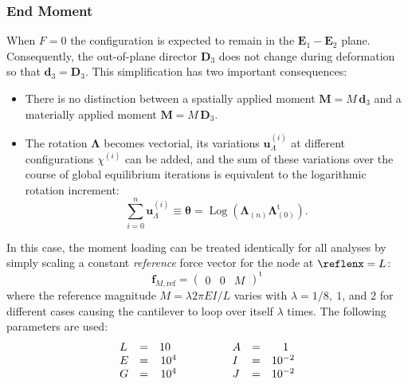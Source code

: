 \subsubsection{End Moment}\label{sec:circle}
%
%
When \(F = 0\) the configuration is expected
to remain in the \(\mathbf{E}_1 - \mathbf{E}_2\) plane.
Consequently, the out-of-plane director
\(\mathbf{D}_3\) does not change during deformation so that \(\mathbf{d}_3 = \mathbf{D}_3\).
This simplification has two important consequences:
\begin{itemize}
  \item There is no distinction between a spatially applied moment \(\boldsymbol{M} = M \, \mathbf{d}_3\)
    and a materially applied moment \(\boldsymbol{M} = M \, \mathbf{D}_3\).
  \item The rotation \(\boldsymbol{\Lambda}\) becomes
    vectorial, its variations \(\boldsymbol{u}_{\scriptscriptstyle{\Lambda}}^{(i)}\) at different configurations \(\chi^{(i)}\) can be added, and the sum of these variations over the course of global equilibrium iterations is equivalent
    to the logarithmic rotation increment:
    \[
      \sum_{i=0}^n \boldsymbol{u}_{\scriptscriptstyle{\Lambda}}^{(i)} \equiv \boldsymbol{\theta} 
     = \operatorname{Log} \left(\boldsymbol{\Lambda}_{(n)}\boldsymbol{\Lambda}_{(0)}^{\mathrm{t}}\right).
    \]
\end{itemize}
%
In this case, the moment loading can be treated identically for all analyses by simply scaling a constant \emph{reference} force vector for the node at \(\reflenx=L\):
%
\begin{equation}
  \mathbf{f}_{M,\text{ref}} = \begin{pmatrix}
     0 & 0 & M
  \end{pmatrix}^{\mathrm{t}}
  \label{eq:fref}
\end{equation}
%
where the reference magnitude \(M = \lambda 2 \pi EI/L \) varies with $\lambda=1/8, \ 1$, and $2$ for different cases causing the cantilever to loop over itself \(\lambda\) times. 
The following parameters are used:
\[
\begin{array}{lcr}
    L  &=&    10\hphantom{..}    \\ %
    E  &=&    10^4  \\ %
    G  &=&    10^4  \\ %
\end{array}
\qquad\qquad
\begin{array}{lcr}
    A  &=& 1\hphantom{..} \\
    I  &=& 10^{-2} \\
    J  &=& 10^{-2} \\
\end{array}
\]
